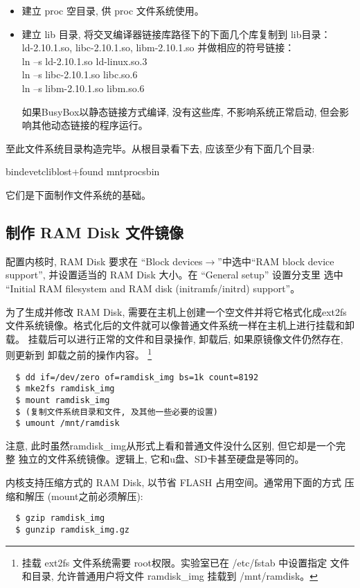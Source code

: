 \begin{itemize}
  \item 建立 proc 空目录, 供 proc 文件系统使用。
  \item 建立 lib 目录, 将交叉编译器链接库路径下的下面几个库复制到 lib目录：\\
      ld-2.10.1.so, libc-2.10.1.so, libm-2.10.1.so 并做相应的符号链接：\\
        ln --s ld-2.10.1.so ld-linux.so.3\\
        ln --s libc-2.10.1.so libc.so.6\\
        ln --s libm-2.10.1.so libm.so.6

        如果BusyBox以静态链接方式编译, 没有这些库, 不影响系统正常启动, 
        但会影响其他动态链接的程序运行。
\end{itemize}

至此文件系统目录构造完毕。从根目录看下去, 应该至少有下面几个目录:

bin\qquad  dev\qquad  etc\qquad  lib\qquad lost+found\qquad
mnt\qquad proc\qquad sbin

它们是下面制作文件系统的基础。

\subsection{制作 RAM Disk 文件镜像}
配置内核时, RAM Disk 要求在 ``Block devices$\to$''中选中``RAM block
device support'', 并设置适当的 RAM Disk 大小。在 ``General setup'' 设置分支里
选中 ``Initial RAM filesystem and RAM disk (initramfs/initrd) support''。

为了生成并修改 RAM Disk, 需要在主机上创建一个空文件并将它格式化成ext2fs
文件系统镜像。格式化后的文件就可以像普通文件系统一样在主机上进行挂载和卸载。
挂载后可以进行正常的文件和目录操作, 卸载后, 如果原镜像文件仍然存在, 则更新到
卸载之前的操作内容。
\footnote{ 挂载 ext2fs 文件系统需要 root权限。实验室已在 /etc/fstab 中设置指定
文件和目录, 允许普通用户将文件 ramdisk\_img 挂载到 /mnt/ramdisk。}
\begin{verbatim}
  $ dd if=/dev/zero of=ramdisk_img bs=1k count=8192
  $ mke2fs ramdisk_img
  $ mount ramdisk_img
  $ (复制文件系统目录和文件, 及其他一些必要的设置)
  $ umount /mnt/ramdisk
\end{verbatim}

注意, 此时虽然ramdisk\_img从形式上看和普通文件没什么区别, 但它却是一个完整
独立的文件系统镜像。逻辑上, 它和u盘、SD卡甚至硬盘是等同的。

内核支持压缩方式的 RAM Disk, 以节省 FLASH 占用空间。通常用下面的方式
压缩和解压 (mount之前必须解压):
\begin{verbatim}
  $ gzip ramdisk_img
  $ gunzip ramdisk_img.gz
\end{verbatim}

